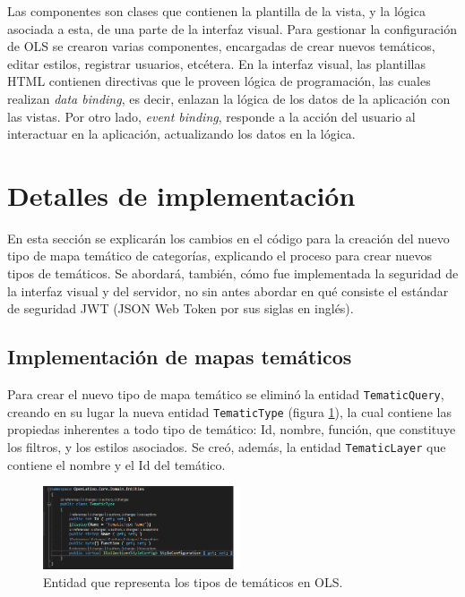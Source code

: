 Las componentes son clases que contienen la plantilla de la vista, y la l\'ogica asociada a esta, de una parte de la interfaz visual. Para gestionar la configuraci\'on de OLS se crearon varias componentes, encargadas de crear nuevos tem\'aticos, editar estilos, registrar usuarios, etc\'etera. En la interfaz visual, las plantillas HTML contienen directivas que le proveen l\'ogica de programaci\'on, las cuales realizan \textit{data binding}, es decir, enlazan la l\'ogica de los datos de la aplicaci\'on con las vistas. Por otro lado, \textit{event binding}, responde a la acci\'on del usuario al interactuar en la aplicaci\'on, actualizando los datos en la l\'ogica.


\section{Detalles de implementaci\'on}
En esta secci\'on se explicar\'an los cambios en el c\'odigo para la creaci\'on del nuevo tipo de mapa tem\'atico de categor\'ias, explicando el proceso para crear nuevos tipos de tem\'aticos. Se abordar\'a, tambi\'en, c\'omo fue implementada la seguridad de la interfaz visual y del servidor, no sin antes abordar en qu\'e consiste el est\'andar de seguridad JWT (JSON Web Token por sus siglas en ingl\'es).

\subsection{Implementaci\'on de mapas tem\'aticos}
Para crear el nuevo tipo de mapa tem\'atico se elimin\'o la entidad \texttt{TematicQuery}, creando en su lugar la nueva entidad \texttt{TematicType} (figura \ref{tematicType}), la cual contiene las propiedas inherentes a todo tipo de tem\'atico: Id, nombre, funci\'on, que constituye los filtros, y los estilos asociados. Se cre\'o, adem\'as, la entidad \texttt{TematicLayer} que contiene el nombre y el Id del tem\'atico.

\begin{figure}
\vspace{-20pt}
\begin{center}
\includegraphics[width=0.52\textwidth]{images/tematicType.png} 
\end{center} \vspace{-20pt} \caption{Entidad que representa los tipos de tem\'aticos en OLS.}  \label{tematicType} \vspace{-10pt} 
\end{figure}

